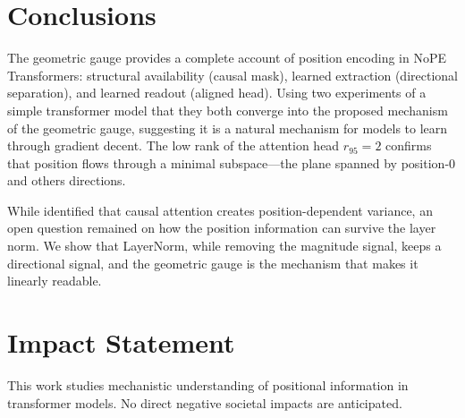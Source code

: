 \documentclass{article}
\theoremstyle{plain}
\theoremstyle{definition}
\theoremstyle{remark}
\begin{document}
\section{Conclusions}

The geometric gauge provides a complete account of position encoding in NoPE Transformers:
structural availability (causal mask), learned extraction (directional separation), and learned readout (aligned head).
Using two experiments of a simple transformer model that they both converge into the proposed mechanism of the geometric gauge, suggesting it is a natural mechanism for models to learn through gradient decent.
The low rank of the attention head $r_{95}=2$ confirms that position flows through a minimal subspace---the plane spanned by position-0 and others directions.

While \citet{chi-etal-2023-latent} identified that causal attention creates position-dependent variance, an open question remained on how the position information can survive the layer norm.
We show that LayerNorm, while removing the magnitude signal, keeps a directional signal, and the geometric gauge is the mechanism that makes it linearly readable.



\section*{Impact Statement}
This work studies mechanistic understanding of positional information in transformer models. No direct negative
societal impacts are anticipated.
\end{document}
